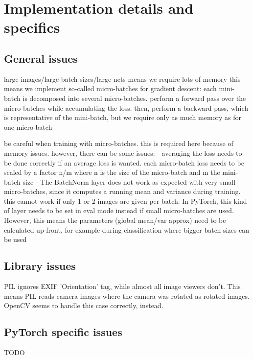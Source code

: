 \documentclass[fleqn]{article}
\begin{document}



\newpage
\appendix
\section{Implementation details and specifics}
\subsection{General issues}
large images/large batch sizes/large nets means we require lots of memory
this means we implement so-called micro-batches for gradient descent:
each mini-batch is decomposed into several micro-batches.
perform a forward pass over the micro-batches while accumulating the loss.
then, perform a backward pass, which is representative of the mini-batch,
but we require only as much memory as for one micro-batch


be careful when training with micro-batches. this is required here because
of memory issues. however, there can be some issues:
    - averaging the loss needs to be done correctly if an average loss
    is wanted. each micro-batch loss needs to be scaled by a factor n/m
    where n is the size of the micro-batch and m the mini-batch size
    - The BatchNorm layer does not work as expected with very small
    micro-batches, since it computes a running mean and variance during
    training. this cannot work if only 1 or 2 images are given per batch.
    In PyTorch, this kind of layer needs to be set in eval mode instead
    if small micro-batches are used. However, this means the parameters
    (global mean/var approx) need to be calculated up-front, for example
    during classification where bigger batch sizes can be used

\subsection{Library issues}
PIL ignores EXIF 'Orientation' tag, while almost all image viewers don't.
This means PIL reads camera images where the camera was rotated as rotated
images. OpenCV seems to handle this case correctly, instead.

\subsection{PyTorch specific issues}
TODO
\end{document}
